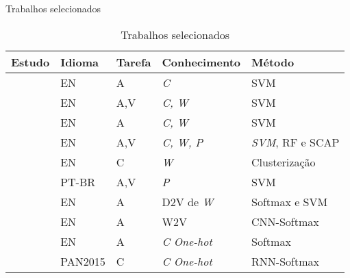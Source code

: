 \begin{frame}{Trabalhos selecionados}
\setlength{\tabcolsep}{5pt}\selectFont
\begin{table}[]
	\caption{Trabalhos selecionados}
	\begin{tabular}{lllll}
		\toprule
		{ Estudo}                   & {  Idioma}     & { Tarefa} & {  Conhecimento}      & {  Método}           \\ \toprule
		\citeonline{aa-Sapkota2015} & EN             & A         & {\it C}               & SVM                  \\ \hline
		\citeonline{aa-distortion}  & EN             & A,V       & {\it C, W}            & SVM                  \\ \midrule
		\citeonline{Schwartz2013}   & EN             & A         & {\it C, W}            & SVM                  \\ \hline
		\citeonline{aa-rocha-2017}  & EN             & A,V       & {\it C, W, P}         & {\it SVM}, RF e SCAP \\ \midrule
		\citeonline{AA_delta2017}   & EN             & C         & {\it W}               & Clusterização        \\ \hline
		\citeonline{Varela2016}     & PT-BR          & A,V       & {\it P}               & SVM                  \\ \hline
		\citeonline{posadas2017}    & EN             & A         & D2V de {\it W}        & Softmax e SVM        \\ \hline
		\citeonline{RhodesCS224D}   & EN             & A         & W2V                   & CNN-Softmax          \\ \hline
		\citeonline{Shrestha2017}   & EN             & A         & {\it C One-hot}       & Softmax              \\ \hline
		\citeonline{Bagnall2016}    & PAN2015 & C         & {\it C One-hot}       & RNN-Softmax          \\ \bottomrule
	\end{tabular}
	\label{tab:revisao_sumarizacao_geral}
	\SourcePadrao
\end{table}
\end{frame}

